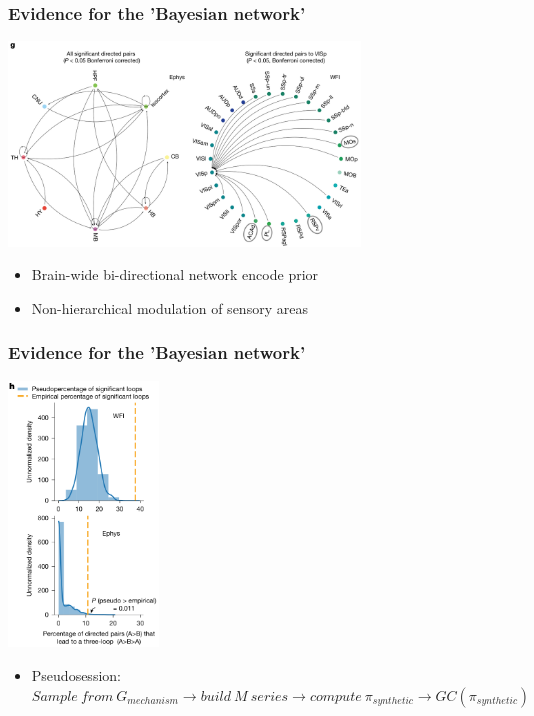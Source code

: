 \documentclass{beamer}
\begin{document}
\begin{frame}
  \frametitle{Evidence for the 'Bayesian network'}
  \begin{center}
    \includegraphics[width=0.7\textwidth, keepaspectratio]{./figure2g}
  \end{center}
  \begin{itemize}
    \item Brain-wide bi-directional network encode prior
    \item Non-hierarchical modulation of sensory areas
  \end{itemize}
\end{frame}

\begin{frame}
  \frametitle{Evidence for the 'Bayesian network'}
  \begin{center}
    \includegraphics[width=0.3\textwidth, keepaspectratio]{./figure2h}
  \end{center}
  \begin{itemize}
    \item Pseudosession: $Sample \ from \ G_{mechanism} \rightarrow build \ M \ series \rightarrow compute \ \pi_{synthetic} \rightarrow GC(\pi_{synthetic})$
  \end{itemize}
\end{frame}
\end{document}
